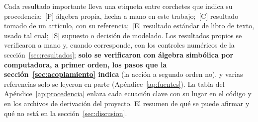 \documentclass[11pt,a4paper]{article}
\numberwithin{equation}{section}
\renewcommand{\_}{\oldunderscore\hspace{0pt}}
\newcommand{\etq}[1]{\,{\footnotesize\color{gray}[#1]}}
\begin{document}
\begin{abstract}
\end{abstract}

\vspace{0.5em}
\begin{alerta}
Cada resultado importante lleva una etiqueta entre corchetes que indica su procedencia: \etq{P} álgebra propia, hecha a mano en este trabajo; \etq{C} resultado tomado de un artículo, con su referencia; \etq{E} resultado estándar de libro de texto, usado tal cual; \etq{S} supuesto o decisión de modelado. Los resultados propios se verificaron a mano y, cuando corresponde, con los controles numéricos de la sección~\ref{sec:resultados}; \textbf{solo se verificaron con álgebra simbólica por computadora, a primer orden, los pasos que la sección~\ref{sec:acoplamiento} indica} (la acción a segundo orden no), y varias referencias solo se leyeron en parte (Apéndice~\ref{ap:fuentes}). La tabla del Apéndice~\ref{ap:procedencia} enlaza cada ecuación clave con su lugar en el código y en los archivos de derivación del proyecto. El resumen de qué se puede afirmar y qué no está en la sección~\ref{sec:discusion}.
\end{alerta}

\tableofcontents
\clearpage















\appendix






\end{document}
